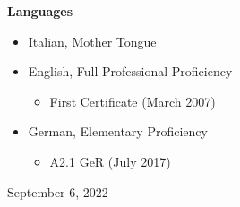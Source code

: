 \documentclass[11pt]{article}
\begin{document}

\vspace*{2.5ex}
\noindent
{\Large\bf Languages}

\begin{itemize}
\item Italian, Mother Tongue
\item English, Full Professional Proficiency
\begin{itemize}
  \item First Certificate (March 2007)
\end{itemize}
\item German, Elementary Proficiency
\begin{itemize}
  \item A2.1 GeR (July 2017)
\end{itemize}
\end{itemize}


\vspace*{4ex}
\noindent
September 6, 2022

\end{document}
